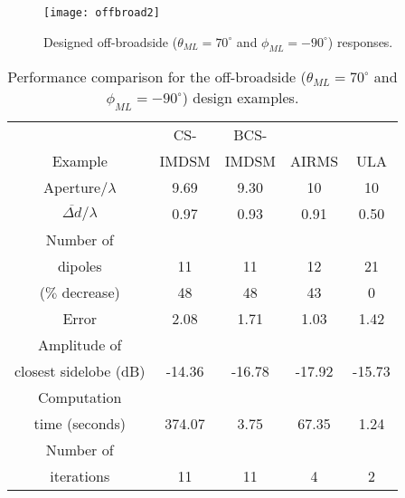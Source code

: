\documentclass[10pt,final]{IEEEtran}
\begin{document}
\begin{figure}
\begin{center}
   \texttt{[image: offbroad2]}
   \caption{Designed off-broadside ($\theta_{ML}=70^{\circ}$ and $\phi_{ML}=-90^{\circ}$) responses.
    \label{fig:offbroad2}}
\end{center}
\end{figure}

\begin{table}
\caption{\rm Performance comparison for the off-broadside ($\theta_{ML}=70^{\circ}$ and $\phi_{ML}=-90^{\circ}$) design examples.} \centering
\begin{tabular}{|c|c|c|c|c|}
  \hline
   & CS- & BCS- & & \\
  Example & IMDSM & IMDSM & AIRMS & ULA\\
  \hline
  Aperture/$\lambda$ & 9.69 & 9.30 & 10 & 10\\
  $\overline{\Delta{d}}/\lambda$ & 0.97 & 0.93 & 0.91 & 0.50\\
  \hline
  Number of &  &  &  &\\
  dipoles & 11 & 11 & 12 &21\\
  ($\%$ decrease) & 48 & 48 &43 & 0\\
  \hline
  Error & 2.08 & 1.71 & 1.03 &1.42\\
  \hline
  Amplitude of &  &  &  &\\
  closest sidelobe (dB)& -14.36 & -16.78 & -17.92 &-15.73\\
  \hline
  Computation &  &  &  &\\
  time (seconds) & 374.07 & 3.75 & 67.35 &1.24\\
  \hline
  Number of &  &  &  &\\
  iterations & 11 & 11 & 4 &2\\
  \hline
\end{tabular}
\label{tb:linearoffbroadcompare2}
\end{table}
\end{document}
